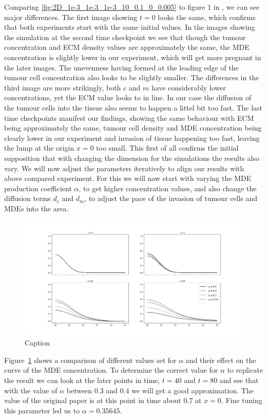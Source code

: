 Comparing \ref{fig:2D_1e-3_1e-3_1e-3_10_0.1_0_0.005} to figure 1 in \cite{anderson_mathematical_2000}, we can see major differences. The first image showing $t=0$ looks the same, which confirms that both experiments start with the same initial values. In the images showing the simulation at the second time checkpoint we see that though the tumour concentration and ECM density values are approximately the same, the MDE concentration is slightly lower in our experiment, which will get more pregnant in the later images. The unevenness having formed at the leading edge of the tumour cell concentration also looks to be slightly smaller. The differences in the third image are more strikingly, both $c$ and $m$ have considerably lower concentrations, yet the ECM value looks to in line. In our case the diffusion of the tumour cells into the tissue also seems to happen a littel bit too fast. The last time checkpoints manifest our findings, showing the same behaviour with ECM being approximately the same, tumour cell density and MDE concentration being clearly lower in our experiment and invasion of tissue happening too fast, leaving the lump at the origin $x=0$ too small. \newline 
This first of all confirms the initial supposition that with changing the dimension for the simulations the results also vary. We will now adjust the parameters iteratively to align our results with above compared experiment. For this we will now start with varying the MDE production coefficient $\alpha$, to get higher concentration values, and also change the diffusion terms $d_c$ and $d_m$, to adjust the pace of the invasion of tumour cells and MDEs into the area.

\begin{figure}[t]
    \centering
    \includegraphics[width=\textwidth]{resources/images/alpha_comparison.png}
    \caption{Caption}
    \label{fig:alpha_comparison}
\end{figure}
Figure~\ref{fig:alpha_comparison} shows a comparison of different values set for $\alpha$ and their effect on the curve of the MDE concentration. To determine the correct value for $\alpha$ to replicate the result we can look at the later points in time, $t=40$ and $t=80$ and see that with the value of $\alpha$ between $0.3$ and $0.4$ we will get a good approximation. The value of the original paper is at this point in time about $0.7$ at $x=0$. Fine tuning this parameter led us to $\alpha=0.35645$.

